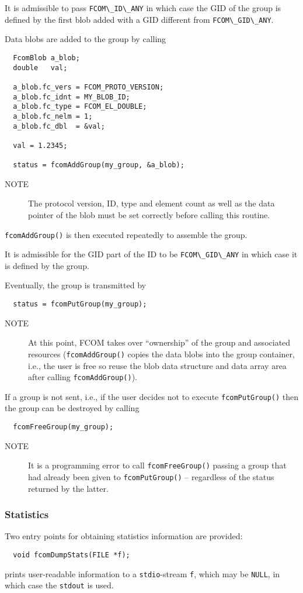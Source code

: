 \documentclass[11pt]{article}
\newcommand{\fcom}{FCOM}
\newcommand{\blob}{blob}
\newcommand{\group}{group}
\newcommand{\cstl}[1]{{\lstinline+#1+}}
\newcommand{\note}[1]{
	\begin{description}
		\item[NOTE] #1
	\end{description}
}
\begin{document}
      It is admissible to pass \cstl{FCOM\_ID\_ANY} in which
      case the GID of the group is defined by the first
	  blob added with a GID different from \cstl{FCOM\_GID\_ANY}.

      Data \blob{}s are added to the group by calling
      \begin{verbatim}
  FcomBlob a_blob;
  double   val;

  a_blob.fc_vers = FCOM_PROTO_VERSION;
  a_blob.fc_idnt = MY_BLOB_ID; 
  a_blob.fc_type = FCOM_EL_DOUBLE;
  a_blob.fc_nelm = 1;
  a_blob.fc_dbl  = &val;
  
  val = 1.2345;

  status = fcomAddGroup(my_group, &a_blob);
      \end{verbatim}
      \note{The protocol version, ID, type and element
      count as well as the data pointer of the \blob{}
      must be set correctly before calling this routine.}
      {\tt fcomAddGroup()} is then executed repeatedly
      to assemble the \group{}.

      It is admissible for the GID part of the ID to
      be \cstl{FCOM\_GID\_ANY} in which case it is defined
      by the group.

      Eventually, the \group{} is transmitted by
      \begin{verbatim}
  status = fcomPutGroup(my_group);
      \end{verbatim}
      \note{At this point, \fcom{} takes over 
      ``ownership'' of the group and associated resources
      ({\tt fcomAddGroup()} copies the data \blob{}s
      into the \group{} container, i.e., the user is
      free so reuse the \blob{} data structure and data 
      array area after calling {\tt fcomAddGroup()}).}

      If a \group{} is not sent, i.e., if the
      user decides not to execute {\tt fcomPutGroup()}
      then the \group{} can be destroyed by
      calling
      \begin{verbatim}
  fcomFreeGroup(my_group);
      \end{verbatim}
      \note{It is a programming error to call {\tt fcomFreeGroup()}
            passing a \group{} that had already been given to
            {\tt fcomPutGroup()} -- regardless of the status
            returned by the latter.}
    \subsubsection{Statistics}
      Two entry points for obtaining statistics information are
      provided:
      \begin{verbatim}
  void fcomDumpStats(FILE *f);
      \end{verbatim}
      prints user-readable information to a \cstl{stdio}-stream
      \cstl{f}, which may be \cstl{NULL}, in which case
      the \cstl{stdout} is used.
\end{document}
